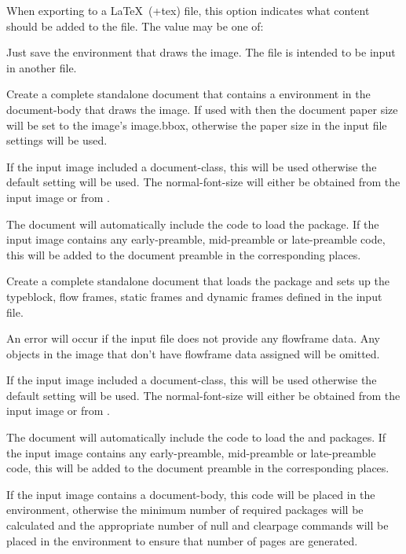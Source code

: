 \documentclass[toc=listof]{scrarticle}
\begin{document}
When exporting to a \LaTeX\ (\ext+{tex}) file, this option indicates
what content should be added to the file. The value may be one of:
\begin{deflist}
\begin{itemdesc}
Just save the  environment that draws the image.
The  file is intended to be \gls{input} in another file.
\end{itemdesc}

\begin{itemdesc}
Create a complete standalone document that contains a
 environment in the \gls{document-body} that draws the image.
If used with  then the document \gls{paper} size will be set
to the image's \gls{image.bbox}, otherwise the paper size in the input
file settings will be used.

If the input image included a \gls{document-class}, this will be used
otherwise the default setting will be used. The
\gls{normal-font-size} will either be obtained from the input image
or from .

The document will automatically include the code to load the
 package.
If the input image contains any \gls{early-preamble}, 
\gls{mid-preamble} or \gls{late-preamble} code, this will be added
to the document preamble in the corresponding places.
\end{itemdesc}

\begin{itemdesc}
Create a complete standalone document that loads the 
package and sets up the \gls{typeblock}, flow frames, static frames
and dynamic frames defined in the input file.

\begin{important}
An error will occur if the input file does not provide any 
\gls{flowframe} data.
Any \glspl{object} in the image that don't have \gls{flowframe} data
assigned will be omitted.
\end{important}

If the input image included a \gls{document-class}, this will be used
otherwise the default setting will be used. The
\gls{normal-font-size} will either be obtained from the input image
or from .

The document will automatically include the code to load the
 and  packages.
If the input image contains any \gls{early-preamble}, 
\gls{mid-preamble} or \gls{late-preamble} code, this will be added
to the document preamble in the corresponding places.

If the input image contains a \gls{document-body}, this code
will be placed in the  environment, otherwise
the minimum number of required packages will be calculated
and the appropriate number of \gls{null} and \gls{clearpage}
commands will be placed in the
 environment to ensure that number of pages are
generated.

\end{itemdesc}

\end{deflist}
\end{document}
